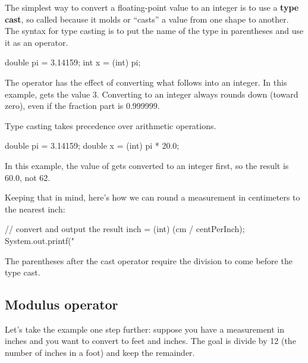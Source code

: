 

The simplest way to convert a floating-point value to an integer is to use a {\bf type cast}, so called because it molds or ``casts'' a value from one shape to another.
The syntax for type casting is to put the name of the type in parentheses and use it as an operator.

\begin{code}
    double pi = 3.14159;
    int x = (int) pi;
\end{code}


The  operator has the effect of converting what follows into an integer.
In this example,  gets the value 3.
Converting to an integer always rounds down (toward zero), even if the fraction part is 0.999999.

Type casting takes precedence over arithmetic operations.

\begin{code}
    double pi = 3.14159;
    double x = (int) pi * 20.0;
\end{code}

In this example, the value of  gets converted to an integer first, so the result is 60.0, not 62.

Keeping that in mind, here's how we can round a measurement in
centimeters to the nearest inch:

\begin{code}
    // convert and output the result
    inch = (int) (cm / centPerInch);
    System.out.printf("%
\end{code}

The parentheses after the cast operator require the division to
come before the type cast.


\subsection{Modulus operator}

Let's take the example one step further: suppose you have a measurement
in inches and you want to convert to feet and inches.
The goal is divide by 12 (the number of inches in a foot) and keep the remainder.


